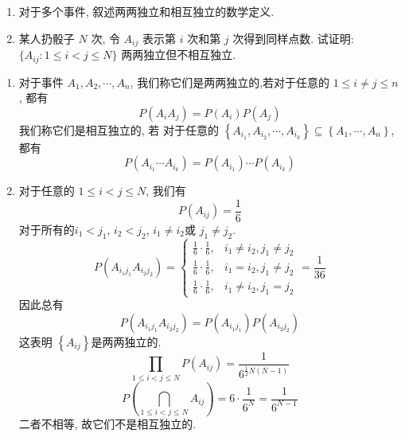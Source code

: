 \documentclass[../main.tex]{subfiles}
\begin{document}
\begin{exercise}{}{}
\begin{enumerate}
    \item 对于多个事件, 叙述两两独立和相互独立的数学定义.
    \item 某人扔骰子 $N$ 次, 令 $A_{ij}$ 表示第 $i$ 次和第 $j$ 次得到同样点数. 试证明: $\{A_{ij}: 1 \le i < j \le N\}$ 两两独立但不相互独立.
\end{enumerate}
\end{exercise}
\begin{solution}
    \begin{enumerate}
        \item 对于事件 \(  A_1,A_2,\cdots ,A_{n}  \), 我们称它们是两两独立的,若对于任意的 \(  1\le i\neq j\le n  \), 都有 \[
        P\left( A_{i}A_{j} \right)= P\left( A_{i} \right)P\left( A_{j} \right)   
        \]  我们称它们是相互独立的, 若 对于任意的 \(  \left\{ A_{i_1}, A_{i_2} ,\cdots , A_{i_{k}}\right\}\subseteq \left\{ A_1,\cdots ,A_{n} \right\}  \), 都有 \[
        P\left(A_{i_1}\cdots A_{i_{k}}\right)=P\left( A_{i_1} \right)\cdots P\left( A_{i_{k}} \right)  
        \]
        \item 对于任意的 \(  1\le i< j\le N  \), 我们有  \[
        P\left( A_{ij} \right)= \frac{1 }{6 }  
        \]对于所有的\(  i_1< j_1  \), \(  i_2< j_2  \), \(  i_1\neq i_2  \)或 \(  j_1\neq j_2  \). \[
        P\left( A_{i_1j_1}A_{i_2j_2} \right)= \begin{cases} \frac{1 }{6 }\cdot \frac{1 }{6 }  ,& i_1\neq i_2, j_1\neq j_2\\ 
       \frac{1 }{6 }\cdot \frac{1 }{6 }    ,&i_1= i_2, j_1\neq j_2  \\ \frac{1 }{6 }\cdot \frac{1 }{6 },& i_1\neq i_2, j_1= j_2  
        \end{cases}   = \frac{1 }{36 }
        \] 因此总有 \[
        P\left( A_{i_1j_1}A_{i_2j_2} \right)= P\left( A_{i_1j_1} \right)P\left( A_{i_2j_2} \right)   
        \] 这表明 \(  \left\{ A_{ij} \right\}  \)是两两独立的.   \[
        \prod _{1\le i< j\le N}P\left( A_{ij} \right)= \frac{1 }{6^{\frac{1 }{2 }N\left( N-1 \right)  } }  
        \] \[
        P\left( \bigcap _{1\le i< j\le N}A_{ij} \right)= 6\cdot  \frac{1 }{6^{N} }= \frac{1 }{6^{N-1} }   
        \]二者不相等, 故它们不是相互独立的.
    \end{enumerate}
    
\end{solution}
\end{document}
